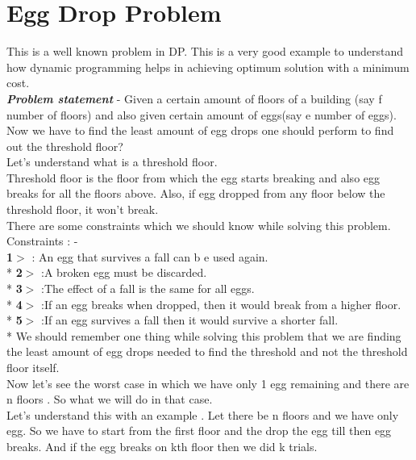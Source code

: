 \documentclass[12pt]{book}
\begin{document}
\chapter{Egg Drop Problem}

This is a well known problem in DP. This is a very good example to understand how dynamic programming helps in achieving optimum solution with a minimum cost.\\
\newline
\textbf{\textit{Problem statement}} -  Given a certain amount of floors of a building (say f  number of floors) and also given certain amount of eggs(say e number of eggs).
Now we have to find the least amount of egg drops one should perform to find out the threshold floor?\\
\newline
Let’s understand  what is a threshold floor.\\
\newline
Threshold floor is  the floor from which the egg starts breaking and also egg breaks for all the floors above. Also, if egg dropped from any floor below the threshold floor, it won’t break.\\
\newline
There are some constraints which we should know while solving this problem.\\
Constraints : -\\
\textbf{1$>$} : An egg that survives a fall can b e used again.\\*
\textbf{2$>$} :A broken egg must be discarded.\\*
\textbf{3$>$} :The effect of a fall is the same for all eggs.\\*
\textbf{4$>$} :If an egg breaks when dropped, then it would break from a higher floor.\\*
\textbf{5$>$} :If an egg survives a fall then it would survive a shorter fall.\\*
\newline
We should remember one thing while solving this problem that we are finding the least amount of egg drops needed to find the threshold and not the threshold floor itself.\\
\newline
Now let’s see the worst case in which we have only 1 egg remaining and there are n floors . So what we will do in that case.\\
\newline
Let’s understand this with an example . Let there be n floors and we have only egg. So we have to start from the first floor and the drop the egg till then egg breaks. And if the egg breaks on kth floor then we did k trials.\\
\end{document}
